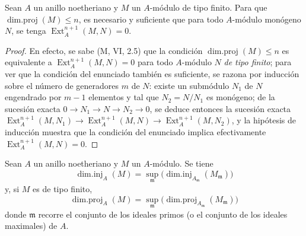 \begin{lemma}[17.2.4]
\label{0.17.2.4-fr}
Sean $A$ un anillo noetheriano y $M$ un $A$-módulo de tipo finito. Para que
$\operatorname{dim.proj}(M)\leq n$, es necesario y suficiente que para todo
$A$-módulo \textup{monógeno} $N$, se tenga $\operatorname{Ext}^{n+1}_A(M,N)=0$.
\end{lemma}

\begin{proof}
En efecto, se sabe (M, VI, 2.5) que la condición
$\operatorname{dim.proj}(M)\leq n$ es equivalente a
$\operatorname{Ext}^{n+1}_A(M,N)=0$ para todo $A$-módulo $N$ \emph{de tipo
finito}; para ver que la condición del enunciado también es suficiente, se
razona por inducción sobre el número de generadores $m$ de $N$: existe un
submódulo $N_1$ de $N$ engendrado por $m-1$ elementos y tal que
$N_2=N/N_1$ es monógeno; de la sucesión exacta
$0\longrightarrow N_1\longrightarrow N\longrightarrow N_2\longrightarrow0$,
se deduce entonces la sucesión exacta
$\operatorname{Ext}^{n+1}_A(M,N_1)\longrightarrow
\operatorname{Ext}^{n+1}_A(M,N)\longrightarrow
\operatorname{Ext}^{n+1}_A(M,N_2)$, y la hipótesis de inducción muestra que la
condición del enunciado implica efectivamente $\operatorname{Ext}^{n+1}_A(M,N)=0$.
\end{proof}

\begin{corollary}[17.2.5]
\label{0.17.2.5-fr}
Sean $A$ un anillo noetheriano y $M$ un $A$-módulo. Se tiene
\begin{equation}
\label{0.17.2.5.1-fr}
\tag{17.2.5.1}
  \operatorname{dim.inj}_A(M)
  =\sup_{\mathfrak{m}}
  \bigl(\operatorname{dim.inj}_{A_{\mathfrak{m}}}(M_{\mathfrak{m}})\bigr)
\end{equation}
y, si $M$ es de tipo finito,
\begin{equation}
\label{0.17.2.5.2-fr}
\tag{17.2.5.2}
  \operatorname{dim.proj}_A(M)
  =\sup_{\mathfrak{m}}
  \bigl(\operatorname{dim.proj}_{A_{\mathfrak{m}}}(M_{\mathfrak{m}})\bigr)
\end{equation}
donde $\mathfrak{m}$ recorre el conjunto de los ideales primos (o el conjunto de los
ideales maximales) de $A$.
\end{corollary}

